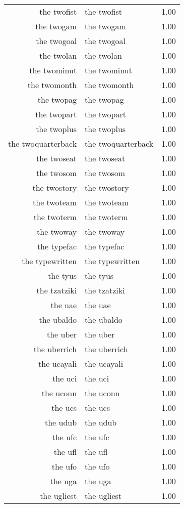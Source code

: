 \begin{table}[ht]
\begin{tabular}{rlr}
  the twofist & the twofist & 1.00 \\ 
  the twogam & the twogam & 1.00 \\ 
  the twogoal & the twogoal & 1.00 \\ 
  the twolan & the twolan & 1.00 \\ 
  the twominut & the twominut & 1.00 \\ 
  the twomonth & the twomonth & 1.00 \\ 
  the twopag & the twopag & 1.00 \\ 
  the twopart & the twopart & 1.00 \\ 
  the twoplus & the twoplus & 1.00 \\ 
  the twoquarterback & the twoquarterback & 1.00 \\ 
  the twoseat & the twoseat & 1.00 \\ 
  the twosom & the twosom & 1.00 \\ 
  the twostory & the twostory & 1.00 \\ 
  the twoteam & the twoteam & 1.00 \\ 
  the twoterm & the twoterm & 1.00 \\ 
  the twoway & the twoway & 1.00 \\ 
  the typefac & the typefac & 1.00 \\ 
  the typewritten & the typewritten & 1.00 \\ 
  the tyus & the tyus & 1.00 \\ 
  the tzatziki & the tzatziki & 1.00 \\ 
  the uae & the uae & 1.00 \\ 
  the ubaldo & the ubaldo & 1.00 \\ 
  the uber & the uber & 1.00 \\ 
  the uberrich & the uberrich & 1.00 \\ 
  the ucayali & the ucayali & 1.00 \\ 
  the uci & the uci & 1.00 \\ 
  the uconn & the uconn & 1.00 \\ 
  the ucs & the ucs & 1.00 \\ 
  the udub & the udub & 1.00 \\ 
  the ufc & the ufc & 1.00 \\ 
  the ufl & the ufl & 1.00 \\ 
  the ufo & the ufo & 1.00 \\ 
  the uga & the uga & 1.00 \\ 
  the ugliest & the ugliest & 1.00 \\ 

\end{tabular}
\end{table}
